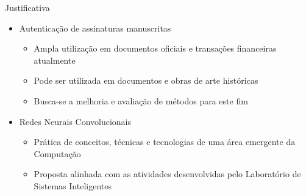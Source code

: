 
\begin{frame}{Justificativa}
	\begin{itemize}
		\item Autenticação de assinaturas manuscritas
		\begin{itemize}
			\item Ampla utilização em \alert{documentos oficiais} e \alert{transações financeiras} atualmente
			\item Pode ser utilizada em documentos e obras de arte históricas
			\item Busca-se a melhoria e avaliação de métodos para este fim
		\end{itemize}
		\bigskip
		\item Redes Neurais Convolucionais
		\begin{itemize}
			\item Prática de conceitos, técnicas e tecnologias de uma área emergente da Computação
			\item Proposta alinhada com as atividades desenvolvidas pelo \alert{Laboratório de Sistemas Inteligentes}
		\end{itemize}
	\end{itemize}
\end{frame}
